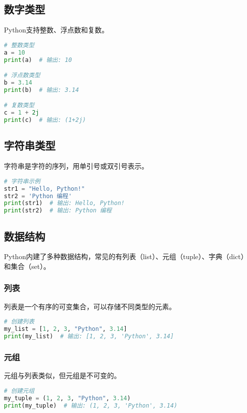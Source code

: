 \documentclass{article}
\begin{document}
\subsection{数字类型}
Python支持整数、浮点数和复数。

\begin{lstlisting}[language=Python,caption=数字类型示例]
# 整数类型
a = 10
print(a)  # 输出: 10

# 浮点数类型
b = 3.14
print(b)  # 输出: 3.14

# 复数类型
c = 1 + 2j
print(c)  # 输出: (1+2j)
\end{lstlisting}

\subsection{字符串类型}
字符串是字符的序列，用单引号或双引号表示。

\begin{lstlisting}[language=Python,caption=字符串类型示例]
# 字符串示例
str1 = "Hello, Python!"
str2 = 'Python 编程'
print(str1)  # 输出: Hello, Python!
print(str2)  # 输出: Python 编程
\end{lstlisting}

\subsection{数据结构}
Python内建了多种数据结构，常见的有列表（list）、元组（tuple）、字典（dict）和集合（set）。

\subsubsection{列表}
列表是一个有序的可变集合，可以存储不同类型的元素。

\begin{lstlisting}[language=Python,caption=列表示例]
# 创建列表
my_list = [1, 2, 3, "Python", 3.14]
print(my_list)  # 输出: [1, 2, 3, 'Python', 3.14]
\end{lstlisting}

\subsubsection{元组}
元组与列表类似，但元组是不可变的。

\begin{lstlisting}[language=Python,caption=元组示例]
# 创建元组
my_tuple = (1, 2, 3, "Python", 3.14)
print(my_tuple)  # 输出: (1, 2, 3, 'Python', 3.14)
\end{lstlisting}
\end{document}
